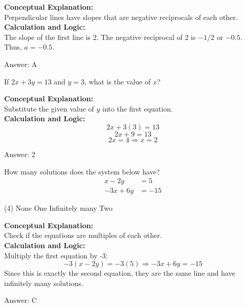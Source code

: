 \documentclass[11pt,paper=a4,answers]{exam}
\begin{document}
\begin{questions}
\begin{solution}
\textbf{Conceptual Explanation:} \\
Perpendicular lines have slopes that are negative reciprocals of each other.
\\[10pt]
\textbf{Calculation and Logic:} \\
The slope of the first line is 2. The negative reciprocal of 2 is $-1/2$ or $-0.5$. Thus, $a = -0.5$.

\vspace{15pt}
Answer: \colorbox{yellow!100}{A}
\end{solution}

\question
If $2x + 3y = 13$ and $y = 3$, what is the value of $x$?

\begin{solution}
\textbf{Conceptual Explanation:} \\
Substitute the given value of $y$ into the first equation.
\\[10pt]
\textbf{Calculation and Logic:} \\
\[2x + 3(3) = 13\]
\[2x + 9 = 13\]
\[2x = 4 \Rightarrow x = 2\]

\vspace{15pt}
Answer: \colorbox{yellow!100}{2}
\end{solution}

\question
How many solutions does the system below have?
\begin{align*}
x - 2y &= 5 \\
-3x + 6y &= -15
\end{align*}
\begin{tasks}(4)
    \task None
    \task One
    \task Infinitely many
    \task Two
\end{tasks}

\begin{solution}
\textbf{Conceptual Explanation:} \\
Check if the equations are multiples of each other.
\\[10pt]
\textbf{Calculation and Logic:} \\
Multiply the first equation by -3:
\[-3(x - 2y) = -3(5) \Rightarrow -3x + 6y = -15\]
Since this is exactly the second equation, they are the same line and have infinitely many solutions.

\vspace{15pt}
Answer: \colorbox{yellow!100}{C}
\end{solution}


\end{questions}
\end{document}
